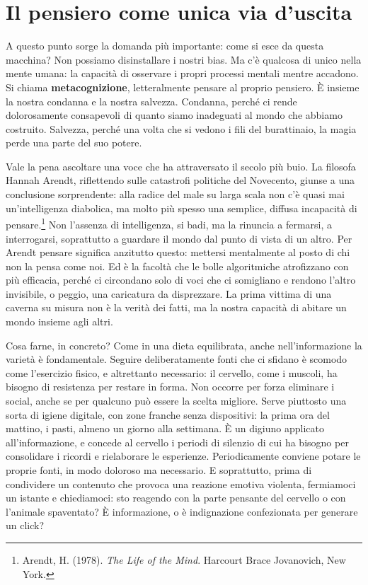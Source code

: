 \section{Il pensiero come unica via d'uscita}

A questo punto sorge la domanda più importante: come si esce da questa macchina? Non possiamo disinstallare i nostri bias. Ma c'è qualcosa di unico nella mente umana: la capacità di osservare i propri processi mentali mentre accadono. Si chiama \textbf{metacognizione}, letteralmente pensare al proprio pensiero. È insieme la nostra condanna e la nostra salvezza. Condanna, perché ci rende dolorosamente consapevoli di quanto siamo inadeguati al mondo che abbiamo costruito. Salvezza, perché una volta che si vedono i fili del burattinaio, la magia perde una parte del suo potere.

Vale la pena ascoltare una voce che ha attraversato il secolo più buio. La filosofa Hannah Arendt, riflettendo sulle catastrofi politiche del Novecento, giunse a una conclusione sorprendente: alla radice del male su larga scala non c'è quasi mai un'intelligenza diabolica, ma molto più spesso una semplice, diffusa incapacità di pensare.\footnote{Arendt, H. (1978). \textit{The Life of the Mind}. Harcourt Brace Jovanovich, New York.} Non l'assenza di intelligenza, si badi, ma la rinuncia a fermarsi, a interrogarsi, soprattutto a guardare il mondo dal punto di vista di un altro. Per Arendt pensare significa anzitutto questo: mettersi mentalmente al posto di chi non la pensa come noi. Ed è la facoltà che le bolle algoritmiche atrofizzano con più efficacia, perché ci circondano solo di voci che ci somigliano e rendono l'altro invisibile, o peggio, una caricatura da disprezzare. La prima vittima di una caverna su misura non è la verità dei fatti, ma la nostra capacità di abitare un mondo insieme agli altri.

Cosa farne, in concreto? Come in una dieta equilibrata, anche nell'informazione la varietà è fondamentale. Seguire deliberatamente fonti che ci sfidano è scomodo come l'esercizio fisico, e altrettanto necessario: il cervello, come i muscoli, ha bisogno di resistenza per restare in forma. Non occorre per forza eliminare i social, anche se per qualcuno può essere la scelta migliore. Serve piuttosto una sorta di igiene digitale, con zone franche senza dispositivi: la prima ora del mattino, i pasti, almeno un giorno alla settimana. È un digiuno applicato all'informazione, e concede al cervello i periodi di silenzio di cui ha bisogno per consolidare i ricordi e rielaborare le esperienze. Periodicamente conviene potare le proprie fonti, in modo doloroso ma necessario. E soprattutto, prima di condividere un contenuto che provoca una reazione emotiva violenta, fermiamoci un istante e chiediamoci: sto reagendo con la parte pensante del cervello o con l'animale spaventato? È informazione, o è indignazione confezionata per generare un click?

